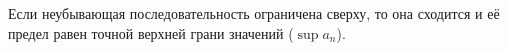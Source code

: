 \label{The18}
Если неубывающая последовательность ограничена сверху, то она сходится и её предел равен точной верхней грани значений ($\sup a_n$).
